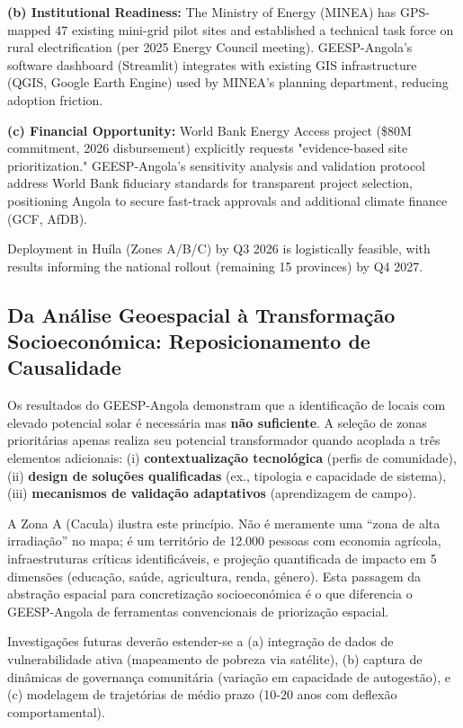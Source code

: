\documentclass[12pt, a4paper]{article}
\begin{document}
{{{{{{{{{{{{\textbf{(b) Institutional Readiness:} The Ministry of Energy (MINEA) has GPS-mapped 47 existing mini-grid pilot sites and established a technical task force on rural electrification (per 2025 Energy Council meeting). GEESP-Angola's software dashboard (Streamlit) integrates with existing GIS infrastructure (QGIS, Google Earth Engine) used by MINEA's planning department, reducing adoption friction.

\textbf{(c) Financial Opportunity:} World Bank Energy Access project (\$80M commitment, 2026 disbursement) explicitly requests "evidence-based site prioritization." GEESP-Angola's sensitivity analysis and validation protocol address World Bank fiduciary standards for transparent project selection, positioning Angola to secure fast-track approvals and additional climate finance (GCF, AfDB).

Deployment in Huíla (Zones A/B/C) by Q3 2026 is logistically feasible, with results informing the national rollout (remaining 15 provinces) by Q4 2027.

\subsection{Da Análise Geoespacial à Transformação Socioeconómica: Reposicionamento de Causalidade}

Os resultados do GEESP-Angola demonstram que a identificação de locais com elevado 
potencial solar é necessária mas \textbf{não suficiente}. A seleção de zonas prioritárias 
apenas realiza seu potencial transformador quando acoplada a três elementos adicionais: 
(i) \textbf{contextualização tecnológica} (perfis de comunidade), (ii) \textbf{design de 
soluções qualificadas} (ex., tipologia e capacidade de sistema), (iii) \textbf{mecanismos 
de validação adaptativos} (aprendizagem de campo).

A Zona A (Cacula) ilustra este princípio. Não é meramente uma ``zona de alta irradiação'' 
no mapa; é um território de 12.000 pessoas com economia agrícola, infraestruturas críticas 
identificáveis, e projeção quantificada de impacto em 5 dimensões (educação, saúde, 
agricultura, renda, género). Esta passagem da abstração espacial para concretização 
socioeconómica é o que diferencia o GEESP-Angola de ferramentas convencionais de 
priorização espacial.

Investigações futuras deverão estender-se a (a) integração de dados de vulnerabilidade 
ativa (mapeamento de pobreza via satélite), (b) captura de dinâmicas de governança 
comunitária (variação em capacidade de autogestão), e (c) modelagem de trajetórias 
de médio prazo (10-20 anos com deflexão comportamental).

}}}}}}}}}}}}
\end{document}
